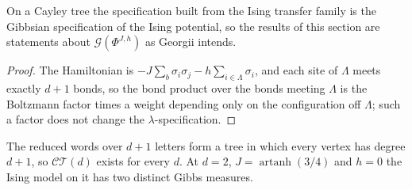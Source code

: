 \begin{theorem}
    \label{thm:ict-identification}
    \leanok

    On a Cayley tree the specification built from the Ising transfer family is the Gibbsian
    specification of the Ising potential, so the results of this section are statements about
    $\mathcal G(\Phi^{J,h})$ as Georgii intends.
\end{theorem}
\begin{proof}
    \leanok
    The Hamiltonian is $-J\sum_{b}\sigma_i\sigma_j - h\sum_{i\in\Lambda}\sigma_i$, and each site of
    $\Lambda$ meets exactly $d+1$ bonds, so the bond product over the bonds meeting $\Lambda$ is the
    Boltzmann factor times a weight depending only on the configuration off $\Lambda$; such a factor
    does not change the $\lambda$-specification.
\end{proof}

\begin{corollary}
    \label{cor:ict-witness}
    \leanok

    The reduced words over $d+1$ letters form a tree in which every vertex has degree $d+1$, so
    $\mathcal{CT}(d)$ exists for every $d$. At $d = 2$, $J = \operatorname{artanh}(3/4)$ and $h = 0$
    the Ising model on it has two distinct Gibbs measures.
\end{corollary}
